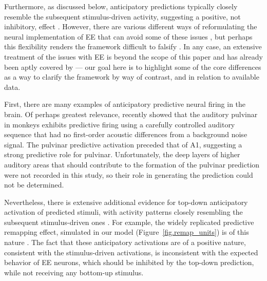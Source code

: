 \documentclass[11pt,twoside]{article}
\newif\myifpdf
\begin{document}
Furthermore, as discussed below, anticipatory predictions typically closely resemble the subsequent stimulus-driven activity, suggesting a positive, not inhibitory, effect  \citep{DuhamelColbyGoldberg92,LeeMumford03,CavanaghHuntAfrazEtAl10,WalshMcGovernClarkEtAl20}.  However, there are various different ways of reformulating the neural implementation of EE that can avoid some of these issues \citep{Spratling08,BastosUsreyAdamsEtAl12}, but perhaps this flexibility renders the framework difficult to falsify \citep{KogoTrengove15}.  In any case, an extensive treatment of the issues with EE is beyond the scope of this paper and has already been aptly covered by \citet{WalshMcGovernClarkEtAl20} --- our goal here is to highlight some of the core differences as a way to clarify the framework by way of contrast, and in relation to available data.

First, there are many examples of anticipatory predictive neural firing in the brain.  Of perhaps greatest relevance, \citet{BarczakOConnellMcGinnisEtAl18} recently showed that the auditory pulvinar in monkeys exhibits predictive firing using a carefully controlled auditory sequence that had no first-order acoustic differences from a background noise signal.  The pulvinar predictive activation preceded that of A1, suggesting a strong predictive role for pulvinar.  Unfortunately, the deep layers of higher auditory areas that should contribute to the formation of the pulvinar prediction were not recorded in this study, so their role in generating the prediction could not be determined.

Nevertheless, there is extensive additional evidence for top-down anticipatory activation of predicted stimuli, with activity patterns closely resembling the subsequent stimulus-driven ones \citep{WalshMcGovernClarkEtAl20}.  For example, the widely replicated predictive remapping effect, simulated in our model (Figure~\ref{fig.remap_units}) is of this nature \citep{DuhamelColbyGoldberg92,Wurtz08,CavanaghHuntAfrazEtAl10}.  The fact that these anticipatory activations are of a positive nature, consistent with the stimulus-driven activations, is inconsistent with the expected behavior of EE neurons, which should be inhibited by the top-down prediction, while not receiving any bottom-up stimulus.
\end{document}
